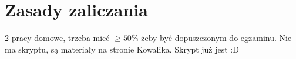 \section{Zasady zaliczania}

2 pracy domowe, trzeba mieć $\ge 50\%$ żeby być dopuszczonym do egzaminu.
Nie ma skryptu, są materiały na stronie Kowalika. Skrypt już jest :D
